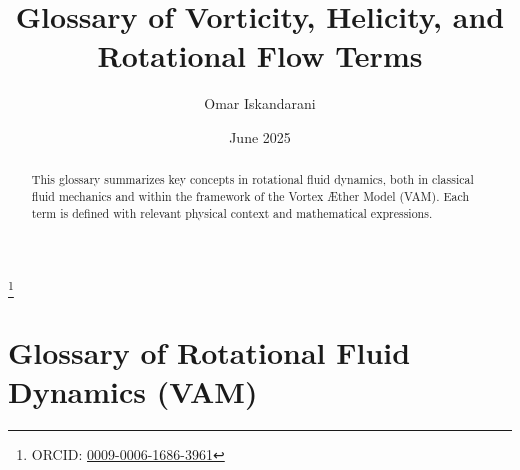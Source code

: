 \documentclass[a4paper, aps,preprint,superscriptaddress, 12pt]{revtex4}
\begin{document}
    \title{Glossary of Vorticity, Helicity, and Rotational Flow Terms}
    \author{Omar Iskandarani}
    \date{June 2025}
    \thanks{ORCID: \href{https://orcid.org/0009-0006-1686-3961}{0009-0006-1686-3961}}

    \begin{abstract}
        This glossary summarizes key concepts in rotational fluid dynamics, both in classical fluid mechanics and within the framework of the Vortex Æther Model (VAM). Each term is defined with relevant physical context and mathematical expressions.
    \end{abstract}

    \maketitle

    \section*{Glossary of Rotational Fluid Dynamics (VAM)}

    \small%
\end{document}
